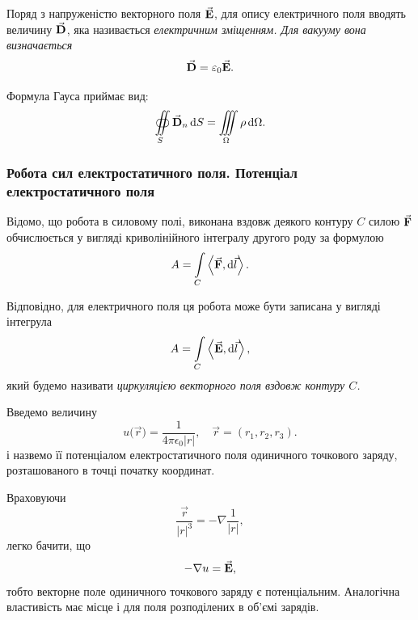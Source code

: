 \begin{definition}
	Поряд з напруженістю векторного поля ${\vec{\mathbf{E}}}$, для опису електричного поля вводять величину ${\vec{\mathbf{D}}}$, яка називається \it{електричним зміщенням}. Для вакууму вона визначається
	\begin{equation}
		{\vec{\mathbf{D}}} = \varepsilon_0 {\vec{\mathbf{E}}}.
	\end{equation}
\end{definition}

Формула Гауса приймає вид:
\begin{equation}
	\displaystyle\oiint\limits_S {\vec{\mathbf{D}}}_n \mathop{}\!\mathrm{d} S = \displaystyle\iiint\limits_\Omega \rho \mathop{}\!\mathrm{d} \Omega.
\end{equation}

\subsubsection{Робота сил електростатичного поля. Потенціал електростатичного поля}

Відомо, що робота в силовому полі, виконана вздовж деякого контуру $C$ силою ${\vec{\mathbf{F}}}$ обчислюється у вигляді криволінійного інтегралу другого роду за формулою
\begin{equation}
	A = \Int_C \langle \vecf F, \diff \vec l\rangle.
\end{equation}

\begin{definition}
	Відповідно, для електричного поля ця робота може бути записана у вигляді інтегрула
	\begin{equation}
		A = \Int_C \langle \vecf E, \diff \vec l\rangle,
	\end{equation} 
	який будемо називати \it{циркуляцією векторного поля} вздовж контуру $C$.
\end{definition}

\begin{definition}
	Введемо величину
	\begin{equation}
		u\Big(\vec r\Big) = \frac{1}{4 \pi \epsilon_0 |r|}, \quad \vec r = (r_1, r_2, r_3).
	\end{equation}
	і назвемо її потенціалом електростатичного поля одиничного точкового заряду, розташованого в точці початку координат.
\end{definition}

Враховуючи 
\begin{equation}
	\frac{\vec r}{|r|^3} = - \nabla \frac{1}{|r|},
\end{equation}
легко бачити, що
\begin{equation}
	-\nabla u = {\vec{\mathbf{E}}},
\end{equation}
тобто векторне поле одиничного точкового заряду є потенціальним. Аналогічна властивість має місце і для поля розподілених в об'ємі зарядів. \medskip



